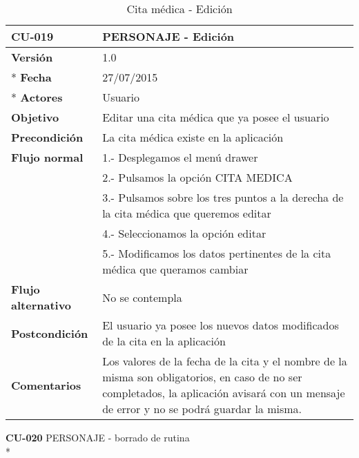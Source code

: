 \documentclass[../pfc.tex]{subfiles}
\begin{document}
		\begin{table}[H]
			\centering
			\begin{tabular}[t]{|p{3cm}|p{9.5cm}|}
				\hline \textbf{CU-019} & \textbf{PERSONAJE - Edición} \\*
				\hline\hline \textbf{Versión} & 1.0 \\ *
				\hline\hline \textbf{Fecha} & 27/07/2015 \\ *
				\hline\textbf{Actores} 	& Usuario\\*
				\hline \textbf{Objetivo} & Editar una cita médica que ya posee el usuario\\* 			
				\hline \textbf{Precondición} & La cita médica existe en la aplicación\\* 
				\hline \textbf{Flujo normal} & 1.- Desplegamos el menú drawer \\* 
				& 2.- Pulsamos la opción CITA MEDICA\\*	
				& 3.- Pulsamos sobre los tres puntos a la derecha de la cita médica que queremos editar\\*	
				& 4.- Seleccionamos la opción editar\\*	
				& 5.- Modificamos los datos pertinentes de la cita médica que queramos cambiar\\*	
				\hline \textbf{Flujo alternativo} & No se contempla \\* 
				\hline \textbf{Postcondición} & El usuario ya posee los nuevos datos modificados de la cita en la aplicación \\* 
				\hline \textbf{Comentarios}   & Los valores de la fecha de la cita y el nombre de la misma son obligatorios, en caso de no ser completados, la aplicación avisará con un mensaje de error y no se podrá guardar la misma.\\*
				\hline
			\end{tabular}
			\caption{Cita médica - Edición}
			\label{tabla:caso019}
		\end{table}
		
		
		
		\textbf{CU-020}	PERSONAJE - borrado de rutina\\*
		
\end{document}

